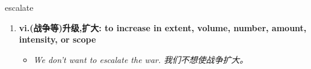 
\begin{frame}
{\huge escalate}
\begin{center}
\begin{enumerate}\Large
  \item \textbf{vi.(战争等)升级,扩大: to increase in extent, volume, number, amount, intensity, or scope}
  \begin{itemize}
    \item \em{\Large{We don’t want to escalate the war. 我们不想使战争扩大。}}
  \end{itemize}
\end{enumerate}
\end{center}
\end{frame}
